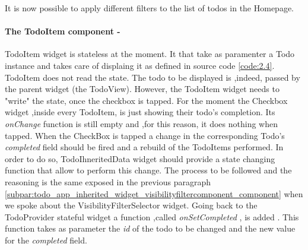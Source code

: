 It is now possible to apply different filters to the list of todos in the Homepage. 


\paragraph{The TodoItem component - }
\label{subpar:todo_app_inherited_widget_todoitem_component}
TodoItem widget is stateless at the moment. It that take as paramenter a Todo instance and takes care of displaing it as defined in source code  \ref{code:2.4}. TodoItem does not read the state. The todo to be displayed is ,indeed, passed by the parent widget (the TodoView). However, the TodoItem widget needs to "write" the state, once the checkbox is tapped. For the moment the Checkbox widget ,inside every TodoItem, is just showing their  todo's completion. Its \textit{onChange   }function is still empty and ,for this reason, it does nothing when tapped. When the CheckBox is tapped a change in the corresponding Todo’s \textit{completed }field should be fired and a rebuild of the TodoItems performed. In order to do so, TodoIhneritedData widget should provide a state changing function that allow to perform this change. The process to be followed and the reasoning is the same exposed in the previous paragraph \ref{subpar:todo_app_inherited_widget_visibilityfiltercomponent_component}  when we spoke about the VisibilityFilterSelector widget. Going back to the TodoProvider stateful widget a function ,called \textit{onSetCompleted  }, is added . This function takes as parameter the \textit{id} of the todo to be changed and the new value for the \textit{completed }field.
\mbox{}\\

